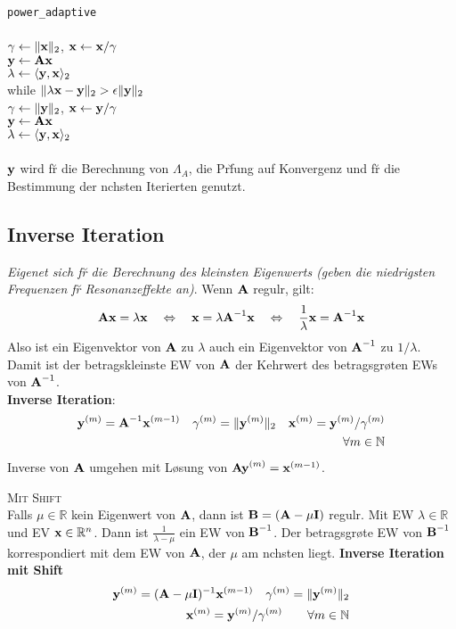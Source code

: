 \verb!power_adaptive!\\
{\addtolength{\leftskip}{0mm}
\hrulefill\\
$\gamma \leftarrow \Vert \mbox{\bf x} \Vert_2$, $\mbox{\bf x} \leftarrow \mbox{\bf x}/\gamma$ \\
$\mbox{\bf y} \leftarrow \mbox{\bf Ax}$\\
$\lambda \leftarrow \langle \mbox{\bf y},\mbox{\bf x} \rangle_2$\\
while $\Vert \lambda\mbox{\bf x} - \mbox{\bf y} \Vert_2 > \epsilon \Vert \mbox{\bf y} \Vert_2$ \\ 
\quad $\gamma \leftarrow \Vert \mbox{\bf y} \Vert_2$, $\mbox{\bf x} \leftarrow \mbox{\bf y}/\gamma$ \\
\quad $\mbox{\bf y} \leftarrow \mbox{\bf Ax}$\\
\quad $\lambda \leftarrow \langle \mbox{\bf y},\mbox{\bf x} \rangle_2$\\
\hrulefill\\
}
$\mbox{\bf y}$ wird f\u r die Berechnung von $\Lambda_A$, die Pr\u fung auf Konvergenz und f\u r die Bestimmung der n\a chsten Iterierten genutzt.

\subsection{Inverse Iteration}
\emph{Eigenet sich f\u r die Berechnung des kleinsten Eigenwerts (geben die niedrigsten Frequenzen f\u r Resonanzeffekte an)}.
Wenn $\mbox{\bf A}$ regul\a r, gilt:
\begin{align*}
\mbox{\bf Ax} = \lambda\mbox{\bf x} \quad\Leftrightarrow\quad \mbox{\bf x} = \lambda\mbox{\bf A}^{-1}\mbox{\bf x} \quad\Leftrightarrow\quad \frac{1}{\lambda}\mbox{\bf x} = \mbox{\bf A}^{-1}\mbox{\bf x}
\end{align*}
Also ist ein Eigenvektor von $\mbox{\bf A}$ zu $\lambda$ auch ein Eigenvektor von $\mbox{\bf A}^{-1}$ zu $1/\lambda$. Damit ist der betragskleinste EW von $\mbox{\bf A}$ der Kehrwert des betragsgr\o \s ten EWs von $\mbox{\bf A}^{-1}$.\\
\textbf{Inverse Iteration}:
\begin{align*}
\mbox{\bf y}^{(m)} = \mbox{\bf A}^{-1}\mbox{\bf x}^{(m-1)} \quad \gamma^{(m)} = \Vert \mbox{\bf y}^{(m)} \Vert_2 \quad \mbox{\bf x}^{(m)} = \mbox{\bf y}^{(m)}/\gamma^{(m)} \\ \forall m\in \mathbb{N}
\end{align*}
Inverse von $\mbox{\bf A}$ umgehen mit L\o sung von $\mbox{\bf Ay}^{(m)} = \mbox{\bf x}^{(m-1)}$.

\textsc{Mit Shift}\\
Falls $\mu \in \mathbb{R}$ kein Eigenwert von $\mbox{\bf A}$, dann ist $\mbox{\bf B}=(\mbox{\bf A}-\mu \mbox{\bf I})$ regul\a r. Mit EW $\lambda \in \mathbb{R}$ und EV $\mbox{\bf x} \in \mathbb{R}^{n}$. Dann ist $\frac{1}{\lambda-\mu}$ ein EW von $\mbox{\bf B}^{-1}$. Der betragsgr\o \s te EW von $\mbox{\bf B}^{-1}$ korrespondiert mit dem EW von $\mbox{\bf A}$, der $\mu$ am n\a chsten liegt.
\textbf{Inverse Iteration mit Shift}
\begin{align*}
\mbox{\bf y}^{(m)} = (\mbox{\bf A}-\mu \mbox{\bf I})^{-1}\mbox{\bf x}^{(m-1)} \quad \gamma^{(m)} = \Vert \mbox{\bf y}^{(m)} \Vert_2 \\ \mbox{\bf x}^{(m)} = \mbox{\bf y}^{(m)}/\gamma^{(m)}  \qquad \forall m\in \mathbb{N}
\end{align*}
\vspace{3cm}

